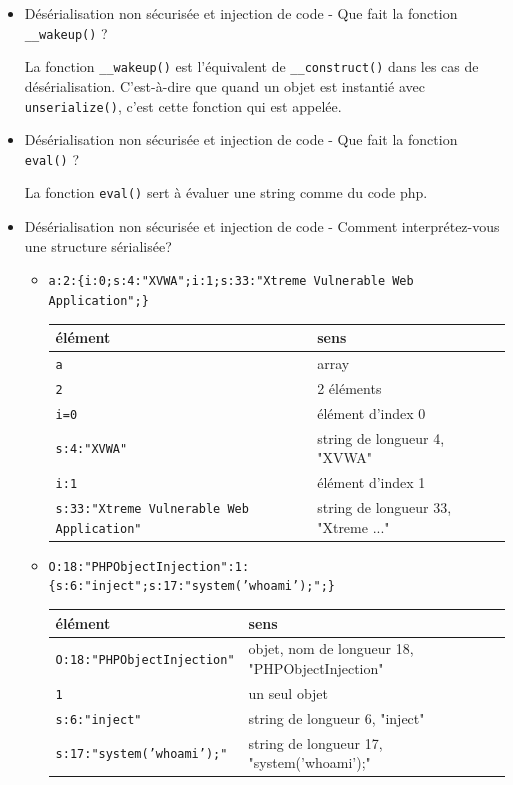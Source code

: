 \documentclass[a4paper]{article}
\begin{document}
\begin{itemize}
\item Désérialisation non sécurisée et injection de code - Que fait la fonction \texttt{\_{}\_wakeup()} ?
\begin{example}
    La fonction \texttt{\_{}\_wakeup()} est l'équivalent de \texttt{\_{}\_construct()} dans les cas de désérialisation. C'est-à-dire que quand un objet est instantié avec \texttt{unserialize()}, c'est cette fonction qui est appelée.
\end{example}


\item Désérialisation non sécurisée et injection de code - Que fait la fonction \texttt{eval()} ?
\begin{example}
    La fonction \texttt{eval()} sert à évaluer une string comme du code php.
\end{example}


\item Désérialisation non sécurisée et injection de code - Comment interprétez-vous une structure sérialisée?
\begin{example} \begin{itemize}
    \item \texttt{a:2:\{i:0;s:4:"XVWA";i:1;s:33:"Xtreme Vulnerable Web Application";\}}
    \begin{center} \begin{tabular}{|l|l|} \hline
        \textbf{élément} & \textbf{sens} \\ \hline
        \texttt{a} & array \\
        \texttt{2} & 2 éléments \\
        \texttt{i=0} & élément d'index 0 \\
        \texttt{s:4:"XVWA"} & string de longueur 4, "XVWA" \\
        \texttt{i:1} & élément d'index 1 \\
        \texttt{s:33:"Xtreme Vulnerable Web Application"} & string de longueur 33, "Xtreme ..." \\ \hline
    \end{tabular} \end{center}
    \item \texttt{O:18:"PHPObjectInjection":1:\{s:6:"inject";s:17:"system('whoami');";\}}
    \begin{center} \begin{tabular}{|l|l|} \hline
        \textbf{élément} & \textbf{sens} \\ \hline
        \texttt{O:18:"PHPObjectInjection"} & objet, nom de longueur 18, "PHPObjectInjection" \\
        \texttt{1} & un seul objet \\
        \texttt{s:6:"inject"} & string de longueur 6, "inject" \\
        \texttt{s:17:"system('whoami');"} & string de longueur 17, "system('whoami');" \\ \hline
    \end{tabular} \end{center}
\end{itemize} \end{example}



\end{itemize}
\end{document}
